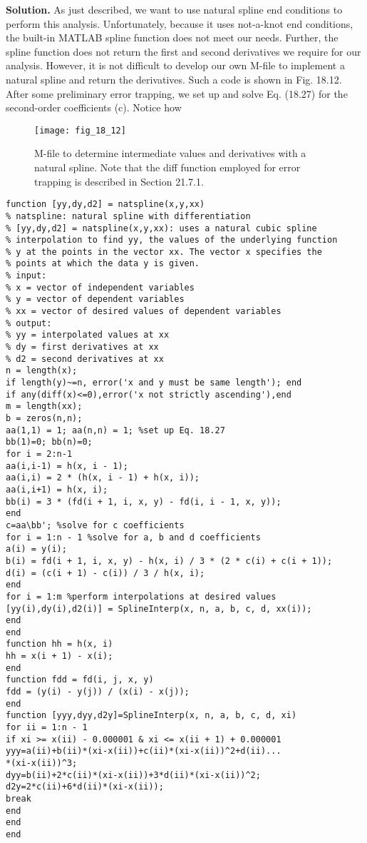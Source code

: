 \documentclass[../main.tex]{subfiles}
\begin{document}
\noindent \textbf{Solution.}
As just described, we want to use natural spline end conditions to perform this
analysis. Unfortunately, because it uses not-a-knot end conditions, the built-in MATLAB
spline function does not meet our needs. Further, the spline function does not return the
first and second derivatives we require for our analysis.
However, it is not difficult to develop our own M-file to implement a natural spline
and return the derivatives. Such a code is shown in Fig. 18.12. After some preliminary error
trapping, we set up and solve Eq. (18.27) for the second-order coefficients (c). Notice how

\begin{figure}[H]
    \centering
    \texttt{[image: fig\_18\_12]}
   \caption{\textsf{M-file to determine intermediate values and derivatives with a natural spline. Note that the diff
   function employed for error trapping is described in Section 21.7.1.}}\label{fig:fig_18_12}
\end{figure}
\begin{lstlisting}[numbers=none]
function [yy,dy,d2] = natspline(x,y,xx)
% natspline: natural spline with differentiation
% [yy,dy,d2] = natspline(x,y,xx): uses a natural cubic spline
% interpolation to find yy, the values of the underlying function
% y at the points in the vector xx. The vector x specifies the
% points at which the data y is given.
% input:
% x = vector of independent variables
% y = vector of dependent variables
% xx = vector of desired values of dependent variables
% output:
% yy = interpolated values at xx
% dy = first derivatives at xx
% d2 = second derivatives at xx
n = length(x);
if length(y)~=n, error('x and y must be same length'); end
if any(diff(x)<=0),error('x not strictly ascending'),end
m = length(xx);
b = zeros(n,n);
aa(1,1) = 1; aa(n,n) = 1; %set up Eq. 18.27
bb(1)=0; bb(n)=0;
for i = 2:n-1
aa(i,i-1) = h(x, i - 1);
aa(i,i) = 2 * (h(x, i - 1) + h(x, i));
aa(i,i+1) = h(x, i);
bb(i) = 3 * (fd(i + 1, i, x, y) - fd(i, i - 1, x, y));
end
c=aa\bb'; %solve for c coefficients
for i = 1:n - 1 %solve for a, b and d coefficients
a(i) = y(i);
b(i) = fd(i + 1, i, x, y) - h(x, i) / 3 * (2 * c(i) + c(i + 1));
d(i) = (c(i + 1) - c(i)) / 3 / h(x, i);
end
for i = 1:m %perform interpolations at desired values
[yy(i),dy(i),d2(i)] = SplineInterp(x, n, a, b, c, d, xx(i));
end
end
function hh = h(x, i)
hh = x(i + 1) - x(i);
end
function fdd = fd(i, j, x, y)
fdd = (y(i) - y(j)) / (x(i) - x(j));
end
function [yyy,dyy,d2y]=SplineInterp(x, n, a, b, c, d, xi)
for ii = 1:n - 1
if xi >= x(ii) - 0.000001 & xi <= x(ii + 1) + 0.000001
yyy=a(ii)+b(ii)*(xi-x(ii))+c(ii)*(xi-x(ii))^2+d(ii)...
*(xi-x(ii))^3;
dyy=b(ii)+2*c(ii)*(xi-x(ii))+3*d(ii)*(xi-x(ii))^2;
d2y=2*c(ii)+6*d(ii)*(xi-x(ii));
break
end
end
end
\end{lstlisting}
\end{document}
